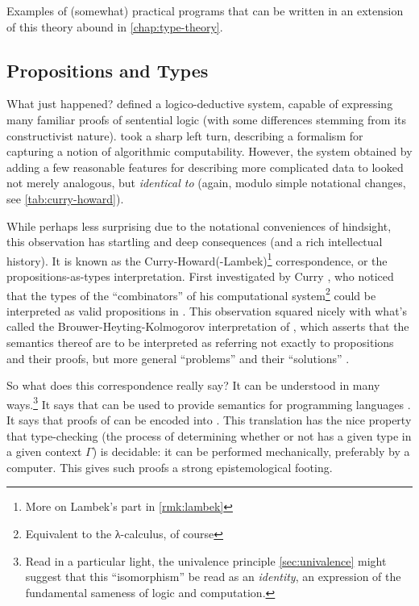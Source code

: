 \documentclass[12pt,twoside]{reedthesis}
\begin{document}
Examples of (somewhat) practical programs that can be written in an extension
of this theory abound in \cref{chap:type-theory}.

\subsection{Propositions and Types}
\label{sec:propositions-and-types}

What just happened?  defined a logico-deductive system, capable of
expressing many familiar proofs of sentential logic (with some differences
stemming from its constructivist nature).  took a
sharp left turn, describing a formalism for capturing a notion of algorithmic
computability. However, the system obtained by adding a few reasonable features
for describing more complicated data to \STLC{} looked not merely
analogous, but \textit{identical to} \IPL{} (again, modulo simple
notational changes, see \cref{tab:curry-howard}).

While perhaps less surprising due to the notational conveniences of hindsight,
this observation has startling and deep consequences (and a rich intellectual
history). It is known as the
Curry-Howard(-Lambek)\footnote{More on Lambek's part in \cref{rmk:lambek}}
correspondence, or the propositions-as-types interpretation. First investigated
by Curry \cite{curry-howard}, who noticed that the types of the ``combinators''
of his computational system\footnote{Equivalent to the λ-calculus, of course}
could be interpreted as valid propositions in \IPL{}. This
observation squared nicely with what's called the Brouwer-Heyting-Kolmogorov
interpretation of \IPL{}, which asserts that the semantics thereof
are to be interpreted as referring not exactly to propositions and their proofs,
but more general ``problems'' and their ``solutions'' \cite{kolmogorov}.

So what does this correspondence really say? It can be understood in many
ways.\footnote{Read in a particular light, the univalence principle
  \cref{sec:univalence} might suggest that this ``isomorphism'' be read
  as an \textit{identity}, an expression of the fundamental sameness of logic
  and computation.}
It says that \TLC{} can be used to provide semantics for programming
languages \cite{landin}. It says that proofs of \IPL{} can be
encoded into \TLC{}. This translation has the nice property that
type-checking (the process of determining whether or not has a given type in a
given context $Γ$) is decidable: it can be performed mechanically, preferably by
a computer. This gives such proofs a strong epistemological footing.
\end{document}
